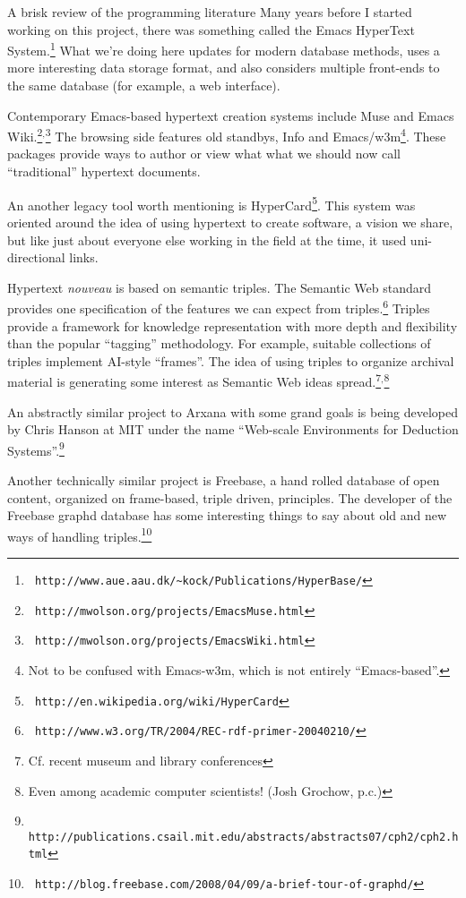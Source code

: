 \begin{notate}{A brisk review of the programming literature} \label{prog-lit-review}
Many years before I started working on this project, there
was something called the Emacs HyperText
System.\footnote{{\tt
    http://www.aue.aau.dk/\~{}kock/Publications/HyperBase/}}
What we're doing here updates for modern database methods,
uses a more interesting data storage format, and also
considers multiple front-ends to the same database (for
example, a web interface).

Contemporary Emacs-based hypertext creation systems
include Muse and Emacs Wiki.\footnote{{\tt
    http://mwolson.org/projects/EmacsMuse.html}}$^,$\footnote{{\tt
    http://mwolson.org/projects/EmacsWiki.html}} The
browsing side features old standbys, Info and
Emacs/w3m\footnote{Not to be confused with Emacs-w3m,
  which is not entirely ``Emacs-based''.}.  These packages
provide ways to author or view what what we should now
call ``traditional'' hypertext documents.

An another legacy tool worth mentioning is
HyperCard\footnote{{\tt
    http://en.wikipedia.org/wiki/HyperCard}}.  This system
was oriented around the idea of using hypertext to create
software, a vision we share, but like just about everyone
else working in the field at the time, it used
uni-directional links.

Hypertext \emph{nouveau} is based on semantic triples.
The Semantic Web standard provides one specification of
the features we can expect from triples.\footnote{{\tt
    http://www.w3.org/TR/2004/REC-rdf-primer-20040210/}}
Triples provide a framework for knowledge representation
with more depth and flexibility than the popular
``tagging'' methodology.  For example, suitable
collections of triples implement AI-style ``frames''.  The
idea of using triples to organize archival material is
generating some interest as Semantic Web ideas
spread.\footnote{Cf. recent museum and library
  conferences}$^,$\footnote{Even among academic computer
  scientists! (Josh Grochow, p.c.)}

An abstractly similar project to Arxana with some grand
goals is being developed by Chris Hanson at MIT under the
name ``Web-scale Environments for Deduction
Systems''.\footnote{{\tt
    http://publications.csail.mit.edu/abstracts/abstracts07/cph2/cph2.html}}

Another technically similar project is Freebase, a hand
rolled database of open content, organized on frame-based,
triple driven, principles.  The developer of the Freebase
graphd database has some interesting things to say about
old and new ways of handling triples.\footnote{{\tt
    http://blog.freebase.com/2008/04/09/a-brief-tour-of-graphd/}}
\end{notate}

